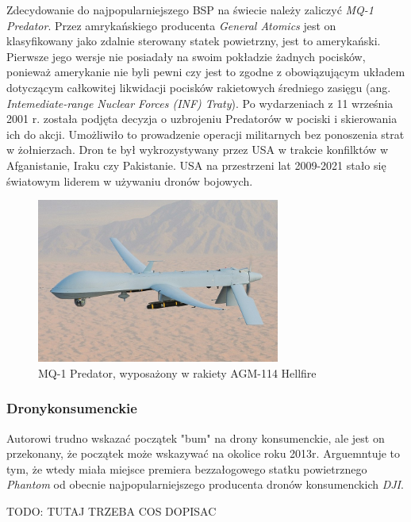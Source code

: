 \hspace{1cm}Zdecydowanie do najpopularniejszego BSP na świecie należy zaliczyć \textit{MQ-1 Predator}. Przez amrykańskiego producenta \textit{General Atomics} jest on klasyfikowany jako zdalnie sterowany statek powietrzny, jest to amerykański. Pierwsze jego wersje nie posiadały na swoim pokładzie żadnych pocisków, ponieważ amerykanie nie byli pewni czy jest to zgodne z obowiązującym układem dotyczącym całkowitej likwidacji pocisków rakietowych średniego zasięgu (ang. \textit{Intemediate-range Nuclear Forces (INF) Traty}). Po wydarzeniach z 11 września 2001 r. została podjęta decyzja o uzbrojeniu Predatorów w pociski i skierowania ich do akcji. Umożliwiło to prowadzenie operacji militarnych bez ponoszenia strat w żołnierzach. Dron te był wykrozystywany przez USA w trakcie konfilktów w Afganistanie, Iraku czy Pakistanie. USA na przestrzeni lat 2009-2021 stało się światowym liderem w używaniu dronów bojowych. \cite{dron-ibuk}\cite{predator-wiki} 


\begin{figure}[!ht]
  \centering
  \includegraphics[width=8cm]{./Obrazy/predator.jpg}
  \caption{MQ-1 Predator, wyposażony w rakiety AGM-114 Hellfire}
  \end{figure}

\subsubsection{Dronykonsumenckie}
\hspace{1cm}Autorowi trudno wskazać początek "bum" na drony konsumenckie, ale jest on przekonany, że początek może wskazywać na okolice roku 2013r. Arguemntuje to tym, że wtedy miała miejsce premiera bezzałogowego statku powietrznego \textit{Phantom} od obecnie najpopularniejszego producenta dronów konsumenckich \textit{DJI}.   

TODO: TUTAJ TRZEBA COS DOPISAC

